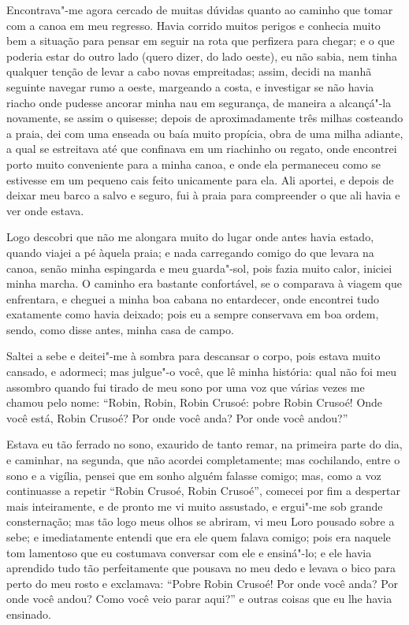 Encontrava"-me agora cercado de muitas dúvidas quanto ao caminho que
tomar com a canoa em meu regresso. Havia corrido muitos perigos e
conhecia muito bem a situação para pensar em seguir na rota que
perfizera para chegar; e o que poderia estar do outro lado (quero dizer,
do lado oeste), eu não sabia, nem tinha qualquer tenção de levar a cabo
novas empreitadas; assim, decidi na manhã seguinte navegar rumo a oeste,
margeando a costa, e investigar se não havia riacho onde pudesse ancorar
minha nau em segurança, de maneira a alcançá"-la novamente, se assim o
quisesse; depois de aproximadamente três milhas costeando a praia, dei
com uma enseada ou baía muito propícia, obra de uma milha adiante, a
qual se estreitava até que confinava em um riachinho ou regato, onde
encontrei porto muito conveniente para a minha canoa, e onde ela
permaneceu como se estivesse em um pequeno cais feito unicamente para
ela. Ali aportei, e depois de deixar meu barco a salvo e seguro, fui à
praia para compreender o que ali havia e ver onde estava.

Logo descobri que não me alongara muito do lugar onde antes havia
estado, quando viajei a pé àquela praia; e nada carregando comigo do que
levara na canoa, senão minha espingarda e meu guarda"-sol, pois fazia
muito calor, iniciei minha marcha. O caminho era bastante confortável,
se o comparava à viagem que enfrentara, e cheguei a minha boa cabana no
entardecer, onde encontrei tudo exatamente como havia deixado; pois eu a
sempre conservava em boa ordem, sendo, como disse antes, minha casa de
campo.

Saltei a sebe e deitei"-me à sombra para descansar o corpo, pois estava
muito cansado, e adormeci; mas julgue"-o você, que lê minha história:
qual não foi meu assombro quando fui tirado de meu sono por uma voz que
várias vezes me chamou pelo nome: ``Robin, Robin, Robin Crusoé: pobre
Robin Crusoé! Onde você está, Robin Crusoé? Por onde você anda? Por onde
você andou?''

Estava eu tão ferrado no sono, exaurido de tanto remar, na primeira
parte do dia, e caminhar, na segunda, que não acordei completamente; mas
cochilando, entre o sono e a vigília, pensei que em sonho alguém falasse
comigo; mas, como a voz continuasse a repetir ``Robin Crusoé, Robin
Crusoé'', comecei por fim a despertar mais inteiramente, e de pronto me
vi muito assustado, e ergui"-me sob grande consternação; mas tão logo
meus olhos se abriram, vi meu Loro pousado sobre a sebe; e imediatamente
entendi que era ele quem falava comigo; pois era naquele tom lamentoso
que eu costumava conversar com ele e ensiná"-lo; e ele havia aprendido
tudo tão perfeitamente que pousava no meu dedo e levava o bico para
perto do meu rosto e exclamava: ``Pobre Robin Crusoé! Por onde você
anda? Por onde você andou? Como você veio parar aqui?'' e outras coisas
que eu lhe havia ensinado.


